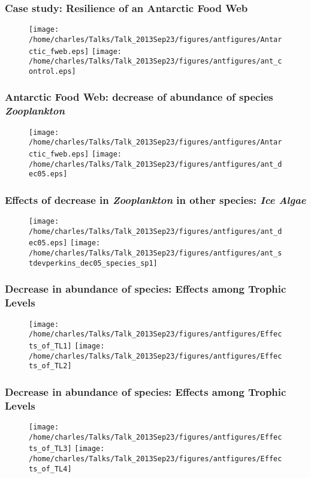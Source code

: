 \documentclass[xcolor=x11names,compress]{beamer}
\renewcommand{\(}{\begin{columns}}
\renewcommand{\)}{\end{columns}}
\newcommand{\<}[1]{\begin{column}{#1}}
\renewcommand{\>}{\end{column}}
\begin{document}
\begin{frame}
\frametitle{Case study: Resilience of an Antarctic Food Web}
\begin{figure}
 \texttt{[image: /home/charles/Talks/Talk\_2013Sep23/figures/antfigures/Antarctic\_fweb.eps]} 
 \texttt{[image: /home/charles/Talks/Talk\_2013Sep23/figures/antfigures/ant\_control.eps]}
\end{figure}
\end{frame}

\begin{frame}
\frametitle{Antarctic Food Web: decrease of abundance of species \emph{Zooplankton}}
\begin{figure}
 \texttt{[image: /home/charles/Talks/Talk\_2013Sep23/figures/antfigures/Antarctic\_fweb.eps]} 
 \texttt{[image: /home/charles/Talks/Talk\_2013Sep23/figures/antfigures/ant\_dec05.eps]} 
\end{figure}
\end{frame}

\begin{frame}
\frametitle{Effects of decrease in \emph{Zooplankton} in other species: \emph{Ice Algae}}
\begin{figure}
 \texttt{[image: /home/charles/Talks/Talk\_2013Sep23/figures/antfigures/ant\_dec05.eps]} 
 \texttt{[image: /home/charles/Talks/Talk\_2013Sep23/figures/antfigures/ant\_stdevperkins\_dec05\_species\_sp1]}
\end{figure}
\end{frame}

\begin{frame}
\frametitle{Decrease in abundance of species: Effects among Trophic Levels}
\begin{figure}
 \texttt{[image: /home/charles/Talks/Talk\_2013Sep23/figures/antfigures/Effects\_of\_TL1]} 
 \texttt{[image: /home/charles/Talks/Talk\_2013Sep23/figures/antfigures/Effects\_of\_TL2]} 
\end{figure}
\end{frame}

\begin{frame}
\frametitle{Decrease in abundance of species: Effects among Trophic Levels}
\begin{figure}
 \texttt{[image: /home/charles/Talks/Talk\_2013Sep23/figures/antfigures/Effects\_of\_TL3]} 
 \texttt{[image: /home/charles/Talks/Talk\_2013Sep23/figures/antfigures/Effects\_of\_TL4]} 
\end{figure}
\end{frame}
\end{document}
